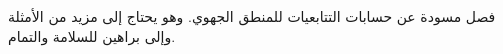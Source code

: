 \documentclass[../../../include/open-logic-chapter]{subfiles}
\begin{document}
\begin{editorial}
  فصل مسودة عن حسابات التتابعيات للمنطق الجهوي. وهو يحتاج إلى مزيد
  من الأمثلة وإلى براهين للسلامة والتمام.
\end{editorial}


\OLEndChapterHook
\end{document}

